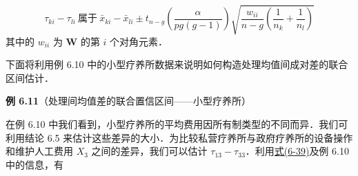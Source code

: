\[
\tau_{ki}-\tau_{li}\ \text{属于}\ \bar{x}_{ki}-\bar{x}_{li}\pm t_{n-g}\left(\frac{\alpha}{pg(g-1)}\right)\sqrt{\frac{w_{ii}}{n-g}\left(\frac{1}{n_k}+\frac{1}{n_l}\right)}
\]
其中的 $w_{ii}$ 为 $\mathbf{W}$ 的第 $i$ 个对角元素．

下面将利用例 6.10 中的小型疗养所数据来说明如何构造处理均值间成对差的联合区间估计．

\noindent\textbf{例 6.11}\quad （处理间均值差的联合置信区间——小型疗养所）

在例 6.10 中我们看到，小型疗养所的平均费用因所有制类型的不同而异．我们可利用结论 6.5 来估计这些差异的大小．为比较私营疗养所与政府疗养所的设备操作和维护人工费用 $X_3$ 之间的差异，我们可以估计 $\tau_{13}-\tau_{33}$．利用\hyperref[eq:6-39]{式(6-39)}及例 6.10 中的信息，有
